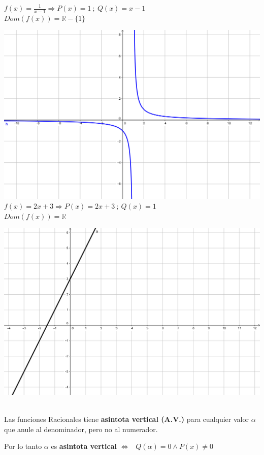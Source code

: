 \documentclass[a4paper,11pt,spanish,sans]{exam}
\begin{document}
\begin{minipage}{0.45\textwidth}
$f(x)=\frac{1}{x-1} \Rightarrow P(x)=1 \: ; \: Q(x)=x-1 $\\
$Dom(f(x))=\mathbb{R} - \lbrace 1\rbrace$

\includegraphics[width= \linewidth]{racejemplo1.png}\\

$f(x)=2x+3 \Rightarrow P(x)=2x+3 \: ; \: Q(x)=1$\\
$Dom(f(x))=\mathbb{R}$

\includegraphics[width= \linewidth]{ejemplo2.png}
\end{minipage}\\

Las funciones Racionales tiene \textbf{asintota vertical (A.V.)} para cualquier valor $\alpha$ que anule al denominador, pero no al numerador.

Por lo tanto $\alpha$ es \textbf{asintota vertical} $\Leftrightarrow$  $\:\: Q(\alpha)=0 \wedge P(x)\neq 0 $
\end{document}
